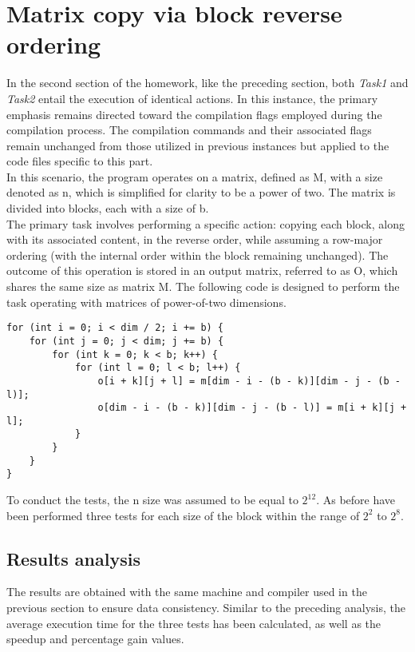 \documentclass{article}
\begin{document}
\clearpage
\section{Matrix copy via block reverse ordering}
In the second section of the homework, like the preceding section, both \textit{Task1} and \textit{Task2} entail the execution of identical actions. %
In this instance, the primary emphasis remains directed toward the compilation flags employed during the compilation process. The compilation commands and their associated flags remain unchanged from those utilized in previous instances but applied to the code files specific to this part.\\
In this scenario, the program operates on a matrix, defined as M, with a size denoted as n, which is simplified for clarity to be a power of two. %
The matrix is divided into blocks, each with a size of b.\\
The primary task involves performing a specific action: copying each block, along with its associated content, in the reverse order, while assuming a row-major ordering (with the internal order within the block remaining unchanged). The outcome of this operation is stored in an output matrix, referred to as O, which shares the same size as matrix M.
The following code is designed to perform the task operating with matrices of power-of-two dimensions.

\begin{code}
    \begin{verbatim}
for (int i = 0; i < dim / 2; i += b) {
    for (int j = 0; j < dim; j += b) {
        for (int k = 0; k < b; k++) {
            for (int l = 0; l < b; l++) {
                o[i + k][j + l] = m[dim - i - (b - k)][dim - j - (b - l)];
                o[dim - i - (b - k)][dim - j - (b - l)] = m[i + k][j + l];
            }
        }
    }
}
    \end{verbatim}
\end{code}

To conduct the tests, the n size was assumed to be equal to $2^{12}$. As before have been performed three tests for each size of the block within the range of $2^2$ to $2^8$.
\subsection*{Results analysis}
The results are obtained with the same machine and compiler used in the previous section to ensure data consistency. %
Similar to the preceding analysis, the average execution time for the three tests has been calculated, as well as the speedup and %
percentage gain values.
\end{document}

